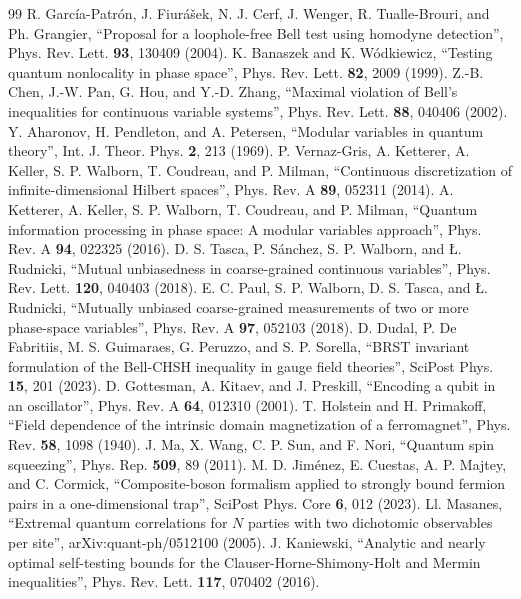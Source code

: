 \documentclass[11pt,a4paper]{article}
\begin{document}
\begin{thebibliography}{99}
 R. Garc\'ia-Patr\'on, J. Fiur\'a\v{s}ek, N. J. Cerf, J. Wenger, R. Tualle-Brouri, and Ph. Grangier, ``Proposal for a loophole-free Bell test using homodyne detection'', Phys. Rev. Lett. \textbf{93}, 130409 (2004).
 K. Banaszek and K. W\'odkiewicz, ``Testing quantum nonlocality in phase space'', Phys. Rev. Lett. \textbf{82}, 2009 (1999).
 Z.-B. Chen, J.-W. Pan, G. Hou, and Y.-D. Zhang, ``Maximal violation of Bell's inequalities for continuous variable systems'', Phys. Rev. Lett. \textbf{88}, 040406 (2002).
 Y. Aharonov, H. Pendleton, and A. Petersen, ``Modular variables in quantum theory'', Int. J. Theor. Phys. \textbf{2}, 213 (1969).
 P. Vernaz-Gris, A. Ketterer, A. Keller, S. P. Walborn, T. Coudreau, and P. Milman, ``Continuous discretization of infinite-dimensional Hilbert spaces'', Phys. Rev. A \textbf{89}, 052311 (2014).
 A. Ketterer, A. Keller, S. P. Walborn, T. Coudreau, and P. Milman, ``Quantum information processing in phase space: A modular variables approach'', Phys. Rev. A \textbf{94}, 022325 (2016).
 D. S. Tasca, P. S\'anchez, S. P. Walborn, and \L. Rudnicki, ``Mutual unbiasedness in coarse-grained continuous variables'', Phys. Rev. Lett. \textbf{120}, 040403 (2018).
 E. C. Paul, S. P. Walborn, D. S. Tasca, and \L. Rudnicki, ``Mutually unbiased coarse-grained measurements of two or more phase-space variables'', Phys. Rev. A \textbf{97}, 052103 (2018).
 D. Dudal, P. De Fabritiis, M. S. Guimaraes, G. Peruzzo, and S. P. Sorella, ``BRST invariant formulation of the Bell-CHSH inequality in gauge field theories'', SciPost Phys. \textbf{15}, 201 (2023).
 D. Gottesman, A. Kitaev, and J. Preskill, ``Encoding a qubit in an oscillator'', Phys. Rev. A \textbf{64}, 012310 (2001).
 T. Holstein and H. Primakoff, ``Field dependence of the intrinsic domain magnetization of a ferromagnet'', Phys. Rev. \textbf{58}, 1098 (1940).
 J. Ma, X. Wang, C. P. Sun, and F. Nori, ``Quantum spin squeezing'', Phys. Rep. \textbf{509}, 89 (2011).
 M. D. Jim\'enez, E. Cuestas, A. P. Majtey, and C. Cormick, ``Composite-boson formalism applied to strongly bound fermion pairs in a one-dimensional trap'', SciPost Phys. Core \textbf{6}, 012 (2023).
 Ll. Masanes, ``Extremal quantum correlations for $N$ parties with two dichotomic observables per site'', arXiv:quant-ph/0512100 (2005).
 J. Kaniewski, ``Analytic and nearly optimal self-testing bounds for the Clauser-Horne-Shimony-Holt and Mermin inequalities'', Phys. Rev. Lett. \textbf{117}, 070402 (2016).

\end{thebibliography}
\end{document}
